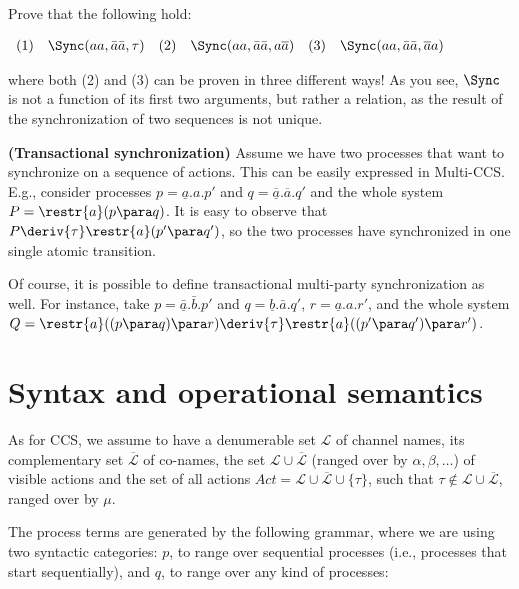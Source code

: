\begin{exercise}
Prove that the following hold:

$\begin{array}{lllllllll}
(1) & \Sync(aa, \bar{a}\bar{a}, \tau) & (2) & \Sync(aa, \bar{a}\bar{a}, a\overline{a}) & (3) & \Sync(aa, \bar{a}\bar{a}, \overline{a}a)  \\
\end{array}$

\noindent
where both (2) and (3) can be proven in three different ways!
As you see, $\Sync$ is not a function of its first two arguments, but rather a relation, 
as the result of the synchronization of two sequences is not unique.
\fine
\end{exercise}

\begin{example}\label{trans-synch}{\bf (Transactional synchronization)} 
Assume we have two processes that want to synchronize
on a sequence of actions. 
This can be easily expressed in Multi-CCS. E.g., consider processes $p = \underline{a}.a.p'$ and
$q =\underline{\overline{a}}.\overline{a}.q'$ and the whole system $P = \restr{a}(p \para q)$. It is easy to observe
that $P \deriv{\tau} \restr{a}(p' \para q')$, so the two processes have synchronized in one single atomic transition.

Of course, it is possible to define transactional multi-party synchronization as well. 
For instance,  take
$p =\underline{\bar{a}}.\bar{b}.p'$ and $q = \underline{b}.\bar{a}.q'$, $r = \underline{a}.a.r'$, and the whole system $Q =
 \restr{a}((p \para q) \para r) \deriv{\tau} \restr{a}((p' \para q') \para r')$.
\fine
\end{example}


\section{Syntax and operational semantics} \label{syntax-sos-multi}

As for CCS, we assume to have a denumerable set ${\mathcal L}$ of channel names, its complementary 
set  $\overline{\mathcal L}$ of co-names, the set  ${\mathcal L}\cup\overline{\mathcal L}$ (ranged over by $\alpha, \beta, \ldots$)
of visible actions and the set of all actions $Act = {\mathcal L} \cup \overline{\mathcal L} \cup\{\tau\}$,
such that $\tau\not\in{\mathcal L}\cup\overline{\mathcal L}$, ranged over by $\mu$.

The process terms are generated by the following grammar, where we are using two syntactic categories: $p$, 
to range over sequential processes (i.e., processes that start sequentially), 
and $q$, to range over any kind of processes:

